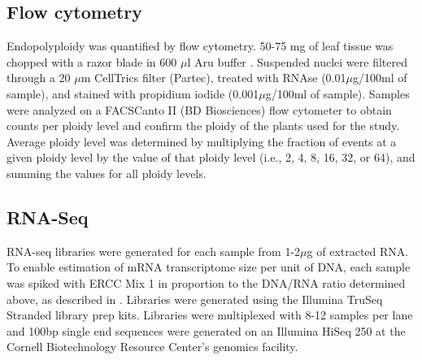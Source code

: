 \documentclass[11pt]{article}
\begin{document}
\subsection*{Flow cytometry}
Endopolyploidy was quantified by flow cytometry.
50-75 mg of leaf tissue was chopped with a razor blade in 600 $\mu$l Aru buffer \citep{arumuganathan1991}.
Suspended nuclei were filtered through a 20 $\mu$m CellTrics filter (Partec), treated with RNAse (0.01$\mu$g/100ml of sample), and stained with propidium iodide (0.001$\mu$g/100ml of sample).
Samples were analyzed on a FACSCanto II (BD Biosciences) flow cytometer to obtain counts per ploidy level and confirm the ploidy of the plants used for the study.
Average ploidy level was determined by multiplying the fraction of events at a given ploidy level by the value of that ploidy level (i.e., 2, 4, 8, 16, 32, or 64), and summing the values for all ploidy levels.

\subsection*{RNA-Seq}
RNA-seq libraries were generated for each sample from 1-2$\mu$g of extracted RNA.
To enable estimation of mRNA transcriptome size per unit of DNA, each sample was spiked with ERCC Mix 1 in proportion to the DNA/RNA ratio determined above, as described in \cite{robinson2018}.
Libraries were generated using the Illumina TruSeq Stranded library prep kits.
Libraries were multiplexed with 8-12 samples per lane and 100bp single end sequences were generated on an Illumina HiSeq 250 at the Cornell Biotechnology Resource Center's genomics facility.
\end{document}
